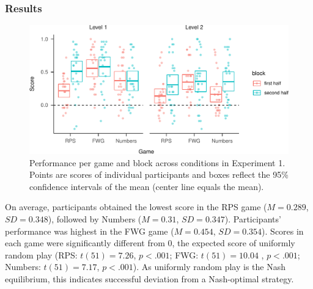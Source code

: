 \documentclass[
  english,
  man,floatsintext]{apa6}
\begin{document}
\hypertarget{results}{%
\subsubsection{Results}\label{results}}

\begin{figure}

{\centering \includegraphics{paper_draft_2021_files/figure-latex/exp1-avg-scores-game-1} 

}

\caption{Performance per game and block across conditions in Experiment 1. Points are scores of individual participants and boxes reflect the 95\% confidence intervals of the mean (center line equals the mean).}\label{fig:exp1-avg-scores-game}
\end{figure}

On average, participants obtained the lowest score in the RPS game (\(M = 0.289\), \(SD = 0.348\)), followed by Numbers (\(M = 0.31\), \(SD = 0.347\)). Participants' performance was highest in the FWG game (\(M = 0.454\), \(SD = 0.354\)). Scores in each game were significantly different from 0, the expected score of uniformly random play (RPS: \(t(51) = 7.26\), \(p < .001\); FWG: \(t(51) = 10.04\) , \(p < .001\); Numbers: \(t(51) = 7.17\), \(p < .001\)). As uniformly random play is the Nash equilibrium, this indicates successful deviation from a Nash-optimal strategy.
\end{document}
